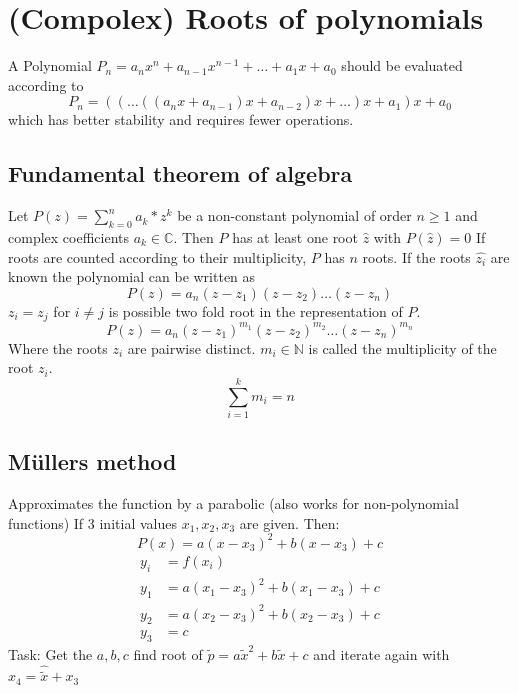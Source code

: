 \chapter{(Compolex) Roots of polynomials}\label{ch:(compolex)-roots-of-polynomials}
A Polynomial $P_n = a_n x^n+a_{n-1}x^{n-1}+\ldots+a_1 x+a_0$
should be evaluated according to
\begin{equation*}
    P_n = ((\ldots((a_n x+a_{n-1})x+a_{n-2})x+\ldots)x+a_1)x+a_0
\end{equation*}
which has better stability and requires fewer operations.


\section{Fundamental theorem of algebra}\label{sec:fundamental-theorem-of-algebra}
Let $P(z)=\sum_{k=0}^n a_k*z^k$ be a non-constant polynomial of order $n \geq 1$
and complex coefficients $a_k \in \mathbb{C}$.
Then $P$ has at least one root $\hat{z}$ with $P(\hat{z})=0$
If roots are counted according to their multiplicity, $P$ has $n$ roots.
If the roots $\hat{z_i}$ are known the polynomial can be written as
\begin{equation*}
    P(z)=a_n(z-z_1)(z-z_2)\ldots(z-z_n)
\end{equation*}
$z_i = z_j$ for $i \neq j$ is possible \textrightarrow{} two fold root in the representation of $P$.
\begin{equation*}
    P(z) = a_n(z-z_1)^{m_1}(z-z_2)^{m_2}\ldots (z-z_n)^{m_n}
\end{equation*}
Where the roots $z_i$ are pairwise distinct.
$m_i \in \mathbb{N}$ is called the multiplicity of the root $z_i$.
\begin{equation*}
    \sum_{i=1}^{k}m_i = n
\end{equation*}


\section{Müllers method}\label{sec:mullers-method}
Approximates the function by a parabolic (also works for non-polynomial functions)
If 3 initial values $x_1, x_2, x_3$ are given.
Then:
\begin{equation*}
    P(x)=a(x-x_3)^2+b(x-x_3)+c
\end{equation*}
\begin{align*}
    y_i &= f(x_i)\\
    y_1 &= a(x_1-x_3)^2+b(x_1-x_3)+c\\
    y_2 &=a(x_2-x_3)^2+b(x_2-x_3)+c\\
    y_3 &=c
\end{align*}
Task: Get the $a,b,c$ find root of $\tilde{p}=a\tilde{x}^2+b\tilde{x}+c$ and iterate again with
$x_4 = \hat{\tilde{x}}+x_3$

